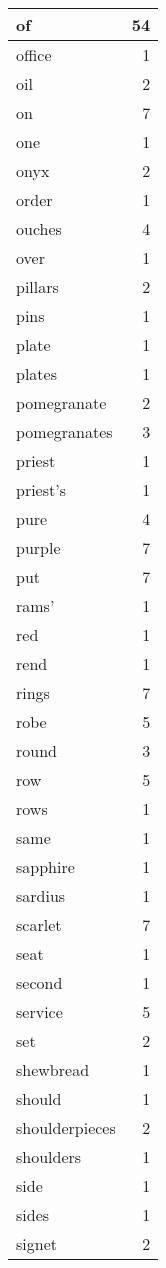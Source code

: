 \begin{center}
\begin{longtable}{l|r}
of & 54 \\ \hline
office & 1 \\ \hline
oil & 2 \\ \hline
on & 7 \\ \hline
one & 1 \\ \hline
onyx & 2 \\ \hline
order & 1 \\ \hline
ouches & 4 \\ \hline
over & 1 \\ \hline
pillars & 2 \\ \hline
pins & 1 \\ \hline
plate & 1 \\ \hline
plates & 1 \\ \hline
pomegranate & 2 \\ \hline
pomegranates & 3 \\ \hline
priest & 1 \\ \hline
priest's & 1 \\ \hline
pure & 4 \\ \hline
purple & 7 \\ \hline
put & 7 \\ \hline
rams' & 1 \\ \hline
red & 1 \\ \hline
rend & 1 \\ \hline
rings & 7 \\ \hline
robe & 5 \\ \hline
round & 3 \\ \hline
row & 5 \\ \hline
rows & 1 \\ \hline
same & 1 \\ \hline
sapphire & 1 \\ \hline
sardius & 1 \\ \hline
scarlet & 7 \\ \hline
seat & 1 \\ \hline
second & 1 \\ \hline
service & 5 \\ \hline
set & 2 \\ \hline
shewbread & 1 \\ \hline
should & 1 \\ \hline
shoulderpieces & 2 \\ \hline
shoulders & 1 \\ \hline
side & 1 \\ \hline
sides & 1 \\ \hline
signet & 2 \\ \hline

\end{longtable}
\end{center}
